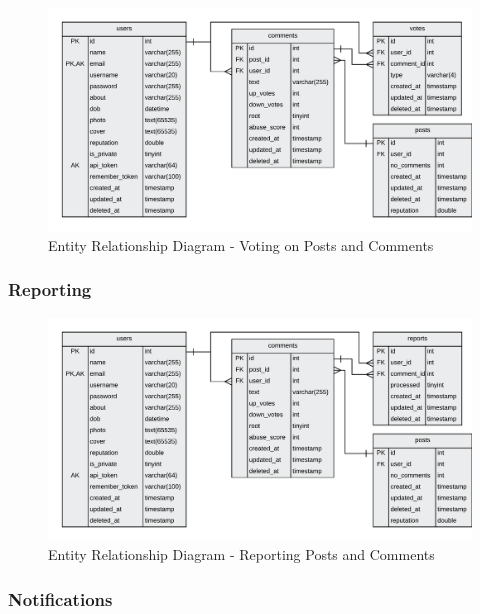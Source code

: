 \begin{figure}[H]
  \centering
  \includegraphics[width=1.0\textwidth]{Images/Design/Database/Votes}
  \caption{Entity Relationship Diagram - Voting on Posts and Comments} \label{fig:ERD_Voting}
\end{figure}

\subsubsection{Reporting}

\begin{figure}[H]
  \centering
  \includegraphics[width=1.0\textwidth]{Images/Design/Database/Reports}
  \caption{Entity Relationship Diagram - Reporting Posts and Comments} \label{fig:ERD_Reporting}
\end{figure}

\subsubsection{Notifications}

